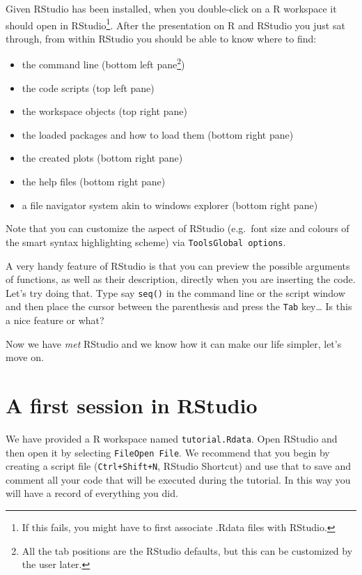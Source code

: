 \documentclass[]{book}
\providecommand{\tightlist}{%
  \setlength{\itemsep}{0pt}\setlength{\parskip}{0pt}}
\let\rmarkdownfootnote\footnote%
\def\footnote{\protect\rmarkdownfootnote}
\theoremstyle{definition}
\theoremstyle{definition}
\theoremstyle{remark}
\begin{document}
Given RStudio has been installed, when you double-click on a R workspace
it should open in RStudio\footnote{If this fails, you might have to
  first associate .Rdata files with RStudio.}. After the presentation on
R and RStudio you just sat through, from within RStudio you should be
able to know where to find:

\begin{itemize}
\tightlist
\item
  the command line (bottom left pane\footnote{All the tab positions are
    the RStudio defaults, but this can be customized by the user later.})
\item
  the code scripts (top left pane)
\item
  the workspace objects (top right pane)
\item
  the loaded packages and how to load them (bottom right pane)
\item
  the created plots (bottom right pane)
\item
  the help files (bottom right pane)
\item
  a file navigator system akin to windows explorer (bottom right pane)
\end{itemize}

Note that you can customize the aspect of RStudio (e.g.~font size and
colours of the smart syntax highlighting scheme) via
\texttt{Tools\textbar{}Global\ options}.

A very handy feature of RStudio is that you can preview the possible
arguments of functions, as well as their description, directly when you
are inserting the code. Let's try doing that. Type say \texttt{seq()} in
the command line or the script window and then place the cursor between
the parenthesis and press the \texttt{Tab} key\ldots{} Is this a nice
feature or what?

Now we have \emph{met} RStudio and we know how it can make our life
simpler, let's move on.

\section{A first session in RStudio}\label{a-first-session-in-rstudio}

We have provided a R workspace named \texttt{tutorial.Rdata}. Open
RStudio and then open it by selecting \texttt{File\textbar{}Open\ File}.
We recommend that you begin by creating a script file
(\texttt{Ctrl+Shift+N}, RStudio Shortcut) and use that to save and
comment all your code that will be executed during the tutorial. In this
way you will have a record of everything you did.
\end{document}
